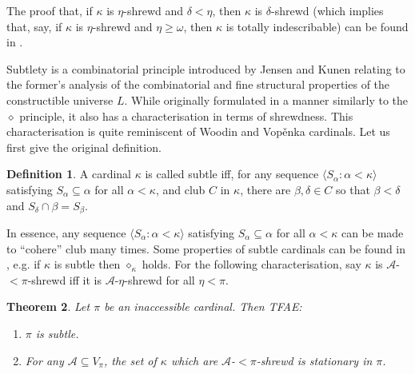 \documentclass{article}
\theoremstyle{definition}
\newtheorem{definition}{Definition}[section]
\theoremstyle{plain}
\newtheorem{theorem}[definition]{Theorem}
\theoremstyle{plain}
\theoremstyle{plain}
\theoremstyle{plain}
\theoremstyle{remark}
\theoremstyle{remark}
\theoremstyle{remark}
\theoremstyle{plain}
\theoremstyle{plain}
\theoremstyle{plain}
\begin{document}
The proof that, if $\kappa$ is $\eta$-shrewd and $\delta < \eta$, then $\kappa$ is $\delta$-shrewd (which implies that, say, if $\kappa$ is $\eta$-shrewd and $\eta \geq \omega$, then $\kappa$ is totally indescribable) can be found in \cite{rathjen2}. 

Subtlety is a combinatorial principle introduced by Jensen and Kunen relating to the former's analysis of the combinatorial and fine structural properties of the constructible universe $L$. While originally formulated in a manner similarly to the $\diamond$ principle, it also has a characterisation in terms of shrewdness. This characterisation is quite reminiscent of Woodin and Vopěnka cardinals. Let us first give the original definition.

\begin{definition}
\label{SubtleDef}
A cardinal $\kappa$ is called subtle iff, for any sequence $\langle S_\alpha: \alpha < \kappa \rangle$ satisfying $S_\alpha \subseteq \alpha$ for all $\alpha < \kappa$, and club $C$ in $\kappa$, there are $\beta, \delta \in C$ so that $\beta < \delta$ and $S_\delta \cap \beta = S_\beta$.
\end{definition}

In essence, any sequence $\langle S_\alpha: \alpha < \kappa \rangle$ satisfying $S_\alpha \subseteq \alpha$ for all $\alpha < \kappa$ can be made to ``cohere'' club many times. Some properties of subtle cardinals can be found in \cite{jensen}, e.g. if $\kappa$ is subtle then $\diamond_\kappa$ holds. For the following characterisation, say $\kappa$ is $\mathcal{A}$-$< \pi$-shrewd iff it is $\mathcal{A}$-$\eta$-shrewd for all $\eta < \pi$.

\begin{theorem}
\label{SubtleFromShrewd}
Let $\pi$ be an inaccessible cardinal. Then TFAE:

\begin{enumerate}
    \item $\pi$ is subtle.
    \item For any $\mathcal{A} \subseteq V_\pi$, the set of $\kappa$ which are $\mathcal{A}$-$< \pi$-shrewd is stationary in $\pi$.
\end{enumerate}
\end{theorem}
\end{document}
